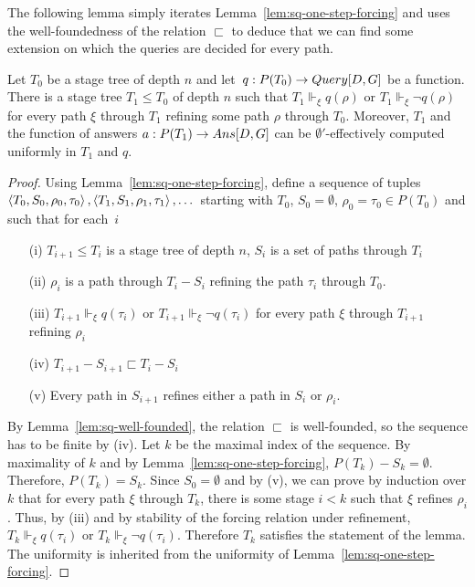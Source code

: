 The following lemma simply iterates Lemma~\ref{lem:sq-one-step-forcing}
and uses the well-foundedness of the relation $\sqsubset$ to deduce
that we can find some extension on which the queries are decided for every path.

\begin{lemma}\label{lem:sq-one-level-forcing}
Let $T_0$ be a stage tree of depth $n$ and let~$q : P(T_0) \to \mathop{Query}[D,G]$ be a function.
There is a stage tree $T_1 \leq T_0$ of depth $n$ such that
$T_1 \Vdash_\xi q(\rho)$ or $T_1 \Vdash_\xi \neg q(\rho)$ for every
path $\xi$ through $T_1$ refining some path $\rho$ through $T_0$.
Moreover, $T_1$ and the function of answers $a : P(T_1) \to \mathop{Ans}[D,G]$
can be $\emptyset'$-effectively computed uniformly in $T_1$ and $q$.
\end{lemma}
\begin{proof}
Using Lemma~\ref{lem:sq-one-step-forcing}, 
define a sequence of tuples $\left\langle T_0, S_0, \rho_0, \tau_0 \right\rangle, \left\langle T_1, S_1, \rho_1, \tau_1 \right\rangle, \dots$
starting with $T_0$, $S_0 = \emptyset$, $\rho_0 = \tau_0 \in P(T_0)$
and such that for each~$i$
\begin{itemize}
	\item[(i)] $T_{i+1} \leq T_i$ is a stage tree of depth $n$, $S_i$ is a set of paths through $T_i$
	\item[(ii)] $\rho_i$ is a path through $T_i - S_i$ refining the path $\tau_i$ through $T_0$.
	\item[(iii)] $T_{i+1} \Vdash_\xi q(\tau_i)$ or $T_{i+1} \Vdash_\xi \neg q(\tau_i)$ for every
	path $\xi$ through $T_{i+1}$ refining $\rho_i$
	\item[(iv)] $T_{i+1} - S_{i+1} \sqsubset T_i - S_i$
	\item[(v)] Every path in $S_{i+1}$ refines either a path in $S_i$ or $\rho_i$.
\end{itemize}
By Lemma~\ref{lem:sq-well-founded}, the relation $\sqsubset$ is well-founded, so the sequence has to be finite by (iv). 
Let $k$ be the maximal index of the sequence.
By maximality of $k$ and by Lemma~\ref{lem:sq-one-step-forcing}, $P(T_k) - S_k = \emptyset$.
Therefore, $P(T_k) = S_k$. Since $S_0 = \emptyset$ and by (v), we can prove by induction over $k$ that
for every path $\xi$ through $T_k$, there is some stage $i < k$ such that $\xi$ refines $\rho_i$.
Thus, by (iii) and by stability of the forcing relation under refinement, $T_k \Vdash_\xi q(\tau_i)$ or $T_k \Vdash_\xi \neg q(\tau_i)$.
Therefore $T_k$ satisfies the statement of the lemma.
The uniformity is inherited from the uniformity of Lemma~\ref{lem:sq-one-step-forcing}.
\end{proof}

